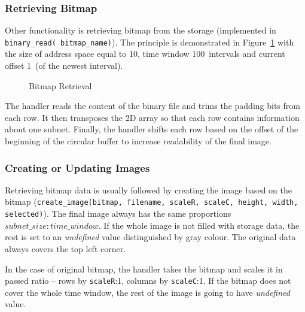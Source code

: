 \subsubsection{Retrieving Bitmap}
Other functionality is retrieving bitmap from the storage (implemented in
\texttt{binary\_read( bitmap\_name)}).
The principle is demonstrated in Figure~\ref{fig:bitmap_retrieval} with the size
of address space equal to 10, time window 100\ intervals and current offset 1~(of the newest interval).

\begin{figure}[H]
   \begin{center}
		 \hfill
      \caption{Bitmap Retrieval} \label{fig:bitmap_retrieval}
	\end{center}
\end{figure}

The handler reads the content of the binary file and trims the padding bits from each row.
It then transposes the 2D array so that each row contains information about one subnet.
Finally, the handler shifts each row based on the offset of the beginning of
the circular buffer to increase readability of the final image.

\subsubsection{Creating or Updating Images}
Retrieving bitmap data is usually followed by creating the image based on the bitmap
(\texttt{create\_image(bitmap, filename, scaleR, scaleC, height, width, selected)}).
The final image always has the same proportions $subnet\_size:time\_window$. If the
whole image is not filled with storage data, the rest is set to an \textit{undefined}
value distinguished by gray colour. The original data always covers the top left corner.

In the case of original bitmap, the handler takes the bitmap and scales it in passed ratio
 -- rows by \texttt{scaleR}:1, columns by \texttt{scaleC}:1. If the bitmap does not
 cover the whole time window, the rest of the image is going to have \textit{undefined} value.
 
